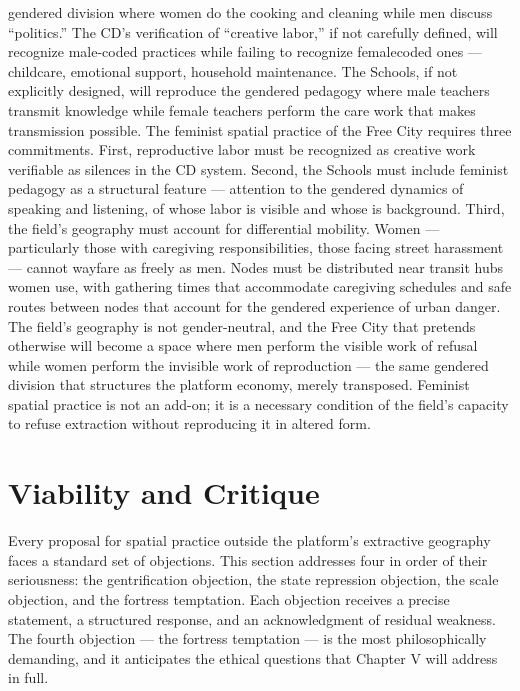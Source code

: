 gendered division where women do the cooking and cleaning while men discuss “politics.” The CD’s verification of “creative labor,” if not carefully defined, will recognize male-coded practices while failing to recognize femalecoded ones — childcare, emotional support, household maintenance. The  Schools, if not explicitly designed, will reproduce the gendered pedagogy where male teachers transmit knowledge while female teachers perform the care work that makes transmission possible. The feminist spatial practice of the Free City requires three commitments. First, reproductive labor must be recognized as creative work verifiable as silences in the CD system. Second, the   Schools must include feminist pedagogy as a structural feature — attention to the gendered dynamics of speaking and listening, of whose labor is visible and whose is background. Third, the field’s geography must account for differential mobility. Women — particularly those with caregiving responsibilities, those facing street harassment — cannot wayfare as freely as men. Nodes must be distributed near transit hubs women use, with gathering times that accommodate caregiving schedules and safe routes between nodes that account for the gendered experience of urban danger. The field’s geography is not gender-neutral, and the Free City that pretends otherwise will become a space where men perform the visible work of refusal while women perform the invisible work of reproduction — the same gendered division that structures the platform economy, merely transposed. Feminist spatial practice is not an add-on; it is a necessary condition of the field’s capacity to refuse extraction without reproducing it in altered form.

\section{Viability and Critique}

Every proposal for spatial practice outside the platform’s extractive geography faces a standard set of objections. This section addresses four in order of their seriousness: the gentrification objection, the state repression objection, the scale objection, and the fortress temptation. Each objection receives a precise statement, a structured response, and an acknowledgment of residual weakness. The fourth objection — the fortress temptation — is the most philosophically demanding, and it anticipates the ethical questions that Chapter V will address in full.

